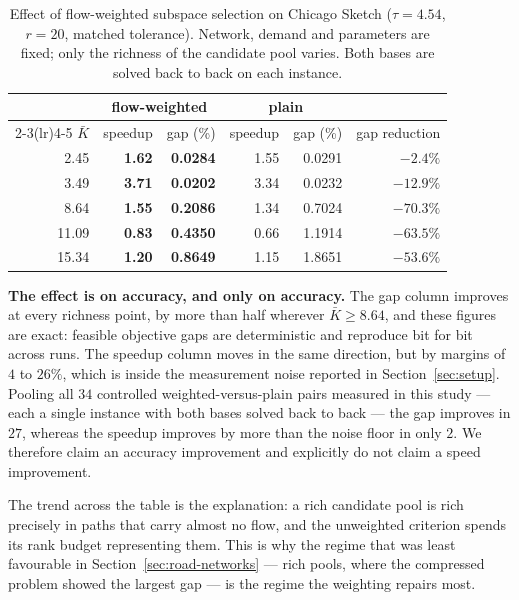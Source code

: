 \documentclass[11pt]{article}
\begin{document}
\begin{table}[h]
\centering
\caption{Effect of flow-weighted subspace selection on Chicago Sketch ($\tau=4.54$, $r=20$,
matched tolerance). Network, demand and parameters are fixed; only the richness of the
candidate pool varies. Both bases are solved back to back on each instance.}
\label{tab:weighted-basis}
{\small
\begin{tabular}{rrrrrr}
\toprule
& \multicolumn{2}{c}{flow-weighted} & \multicolumn{2}{c}{plain} & \\
\cmidrule(lr){2-3}\cmidrule(lr){4-5}
$\bar K$ & speedup & gap (\%) & speedup & gap (\%) & gap reduction\\
\midrule
2.45  & \textbf{1.62} & \textbf{0.0284} & 1.55 & 0.0291 & $-2.4\%$\\
3.49  & \textbf{3.71} & \textbf{0.0202} & 3.34 & 0.0232 & $-12.9\%$\\
8.64  & \textbf{1.55} & \textbf{0.2086} & 1.34 & 0.7024 & $\mathbf{-70.3\%}$\\
11.09 & \textbf{0.83} & \textbf{0.4350} & 0.66 & 1.1914 & $\mathbf{-63.5\%}$\\
15.34 & \textbf{1.20} & \textbf{0.8649} & 1.15 & 1.8651 & $\mathbf{-53.6\%}$\\
\bottomrule
\end{tabular}}
\end{table}

\textbf{The effect is on accuracy, and only on accuracy.} The gap column improves at every
richness point, by more than half wherever $\bar K \ge 8.64$, and these figures are exact:
feasible objective gaps are deterministic and reproduce bit for bit across runs. The speedup
column moves in the same direction, but by margins of $4$ to $26\%$, which is inside the
measurement noise reported in Section~\ref{sec:setup}. Pooling all $34$ controlled
weighted-versus-plain pairs measured in this study --- each a single instance with both bases
solved back to back --- the gap improves in $27$, whereas the speedup improves by more than the
noise floor in only $2$. We therefore claim an accuracy improvement and explicitly do not claim
a speed improvement.

The trend across the table is the explanation: a rich candidate pool is rich precisely in paths
that carry almost no flow, and the unweighted criterion spends its rank budget representing
them. This is why the regime that was least favourable in Section~\ref{sec:road-networks} ---
rich pools, where the compressed problem showed the largest gap --- is the regime the weighting
repairs most.
\end{document}
